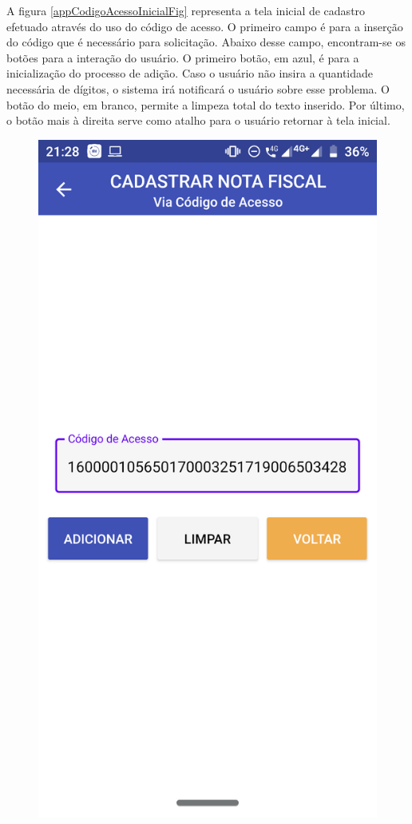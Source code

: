 A figura \ref{appCodigoAcessoInicialFig} representa a tela inicial de cadastro efetuado através do uso do código de acesso. O primeiro campo é para a inserção do código que é necessário para solicitação. Abaixo desse campo, encontram-se os botões para a interação do usuário. O primeiro botão, em azul, é para a inicialização do processo de adição. Caso o usuário não insira a quantidade necessária de dígitos, o sistema irá notificará o usuário sobre esse problema. O botão do meio, em branco, permite a limpeza total do texto inserido. Por último, o botão mais à direita serve como atalho para o usuário retornar à tela inicial.

\newpage
\begin{figure}[h]
    \centering
    \includegraphics[scale=0.15]{tcc/figures/app/app_codigo_acesso_com_codigo.png}

\end{figure}
